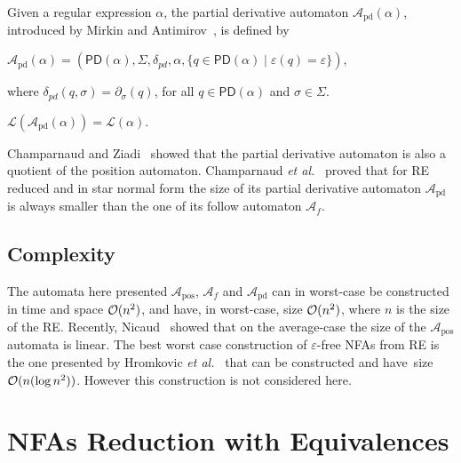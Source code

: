 \documentclass{llncs}
\newcommand{\nfas}{NFAs\xspace}
\newcommand{\re}{RE\xspace}
\newcommand{\lang}{\mathcal{L}}
\newcommand{\PD}{\mathsf{PD}}
\newcommand{\nfa}{\mathcal{A}}
\newcommand{\pos}{{\mathrm{pos}}}
\newcommand{\pd}{{\mathrm{pd}}}
\newcommand{\Alphabet}{\Sigma}
\newcommand{\letter}{\sigma}
\let\epsilon=\varepsilon
\begin{document}
Given a regular expression $\alpha$, the partial derivative automaton
$\nfa_\pd(\alpha)$, introduced by Mirkin and
Antimirov~\cite{b.g.mirkin66:_algor_for_const_base_in,antimirov96:_partial_deriv_regul_expres_finit_autom_const},
is defined by
\begin{center}$
\nfa_\pd(\alpha) = (\PD(\alpha),\Alphabet ,\delta_{pd},\alpha,\{q \in \PD(\alpha)\mid \varepsilon(q)=\varepsilon\}),$
\end{center}
\noindent where $\delta_{pd}(q,\sigma)=\partial_\sigma(q)$, for all
$q\in\PD(\alpha)$ and $\letter \in \Alphabet$.
\begin{proposition} $\lang(\nfa_\pd(\alpha))=\lang(\alpha).$
\end{proposition}
\noindent Champarnaud and
Ziadi~\cite{champarnaud02:_canon_deriv_partial_deriv_and} showed that
the partial derivative automaton is also a quotient of the position
automaton. Champarnaud \emph{et
  al.}~\cite{j.-m.07:_normal_expres_and_finit_autom} proved that for
\re reduced and in star normal form  the size of
its partial derivative automaton $\nfa_\pd$ is always smaller than the one of
its follow automaton $\nfa_f$.
\subsection{Complexity}
\label{ref:complexity}
The automata here presented $\nfa_\pos$, $\nfa_f$ and $\nfa_\pd$ can
in worst-case be constructed in time and space ${\cal O}(n^2)$, and
have, in worst-case, size ${\cal O}(n^2)$, where $n$ is the size of
the \re. Recently,
Nicaud~\cite{nicaud09:_averag_size_of_glush_autom_c} showed that on
the average-case the size of the $\nfa_\pos$ automata is linear.
The best worst case construction of
$\epsilon$-free \nfas from \re is the one presented by Hromkovic
\emph{et al.}~\cite{hromkovic01:_trans_regul_expres_into_small} that
can be constructed and have~size ${\cal O}(n(\log n ^2))$. However
this construction is not considered here.

\section{\nfas Reduction with Equivalences}
\end{document}
